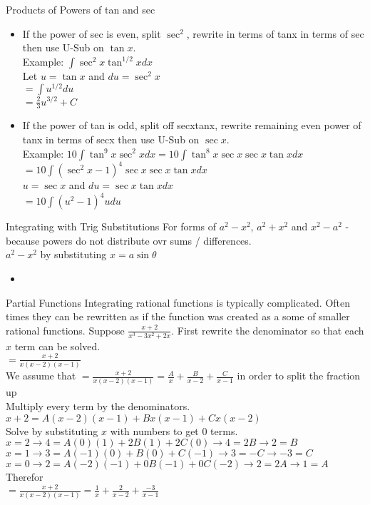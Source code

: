 \documentclass{article}
\begin{document}
\noindent
Products of Powers of tan and sec
\begin{itemize}
  \item If the power of sec is even, split $\sec^2$, rewrite in terms of tanx in terms of sec then use U-Sub on $\tan x$.\\
  Example: $\int{\sec^2x\tan^{1/2}x dx}$\\
  Let $u = \tan{x}$ and $du = \sec^2{x}$\\
  $= \int{u^{1/2}du}$\\
  $= \frac{2}{3}u^{3/2} + C$\\
  \item If the power of tan is odd, split off secxtanx, rewrite remaining even power of tanx in terms of secx then use U-Sub on $\sec{x}$.\\
  Example: $10\int{\tan^9{x}\sec^2{x}dx} = 10\int{\tan^8{x}\sec{x}\sec{x}\tan{x}dx}$\\
  $= 10\int{(\sec^2{x} - 1)^4 \sec{x}\sec{x}\tan{x} dx}$\\
  $u = \sec{x}$ and $du = \sec{x}\tan{x}dx$\\
  $= 10\int{(u^2 - 1)^4 u du}$\\
\end{itemize}

\noindent
\Large
Integrating with Trig Substitutions
\normalsize
\noindent
For forms of $a^2 - x^2$, $a^2 + x^2$ and $x^2 - a^2$ - because powers do not distribute ovr sums / differences.\\
$a^2 - x^2$ by substituting $x = a\sin{\theta}$
\begin{itemize}
  \item
\end{itemize}

\noindent
\Large
Partial Functions
\normalsize
\indent
Integrating rational functions is typically complicated. Often times they can be rewritten as if the function was created as a some of smaller rational functions. Suppose $\frac{x+2}{x^3 -3x^2 +2x}$. First rewrite the denominator so that each $x$ term can be solved.\\
$=\frac{x+2}{x(x-2)(x-1)}$\\
We assume that $=\frac{x+2}{x(x-2)(x-1)} = \frac{A}{x} + \frac{B}{x-2} + \frac{C}{x-1}$ in order to split the fraction up\\
Multiply every term by the denominators. $x+2 = A(x-2)(x-1) + Bx(x-1) + Cx(x-2)$\\
Solve by substituting $x$ with numbers to get 0 terms.\\
$x=2 \to 4 = A(0)(1) + 2B(1) + 2C(0) \to 4 = 2B \to 2 = B$\\
$x=1 \to 3 = A(-1)(0) + B(0) + C(-1) \to 3 = -C \to -3 = C$\\
$x=0 \to 2 = A(-2)(-1) + 0B(-1) + 0C(-2) \to 2 = 2A \to 1 = A$\\
Therefor\\
$=\frac{x+2}{x(x-2)(x-1)} = \frac{1}{x} + \frac{2}{x-2} + \frac{-3}{x-1}$\\
\end{document}
